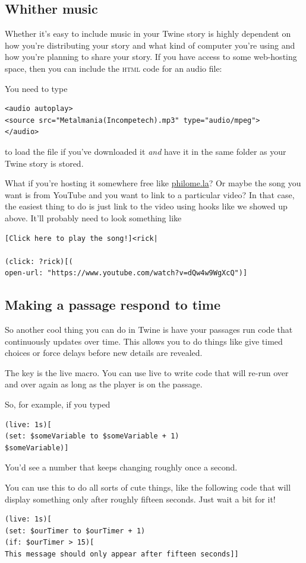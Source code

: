 \documentclass[a5paper,11pt]{article}
\begin{document}
\subsection{Whither music}
Whether it's easy to include music in your Twine story is highly dependent on how you're distributing your story and what kind of computer you're using and how you're planning to share your story. If you have access to some web-hosting space, then you can include the \textsc{html} code for an audio file:

You need to type
\begin{verbatim}
<audio autoplay>
<source src="Metalmania(Incompetech).mp3" type="audio/mpeg">
</audio>
\end{verbatim}

to load the file if you've downloaded it \emph{and} have it in the same folder as your Twine story is stored.

What if you're hosting it somewhere free like \url{philome.la}? Or maybe the song you want is from YouTube and you want to link to a particular video? In that case, the easiest thing to do is just link to the video using hooks like we showed up above. It'll probably need to look something like
\begin{verbatim}
[Click here to play the song!]<rick|

(click: ?rick)[(
open-url: "https://www.youtube.com/watch?v=dQw4w9WgXcQ")]
\end{verbatim}

\subsection{Making a passage respond to time}
So another cool thing you can do in Twine is have your passages run code that continuously updates over time. This allows you to do things like give timed choices or force delays before new details are revealed.

The key is the live macro. You can use live to write code that will re-run over and over again as long as the player is on the passage.

So, for example, if you typed
\begin{verbatim}
(live: 1s)[
(set: $someVariable to $someVariable + 1)
$someVariable)]
\end{verbatim}
You'd see a number that keeps changing roughly once a second.

You can use this to do all sorts of cute things, like the following code that will display something only after roughly fifteen seconds. Just wait a bit for it!
\begin{verbatim}
(live: 1s)[
(set: $ourTimer to $ourTimer + 1)
(if: $ourTimer > 15)[
This message should only appear after fifteen seconds]]
\end{verbatim}
\end{document}
